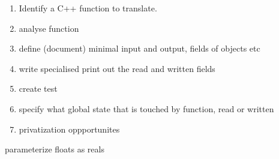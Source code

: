 \begin{enumerate}
  \item Identify a C++ function to translate.
  \item analyse function
  \item define (document) minimal input and output, fields of objects etc
  \item write specialised print out the read and written fields
  \item create test
  \item specify what global state that is touched by function, read or written
  \item privatization oppportunites
\end{enumerate}
parameterize floats as reals
